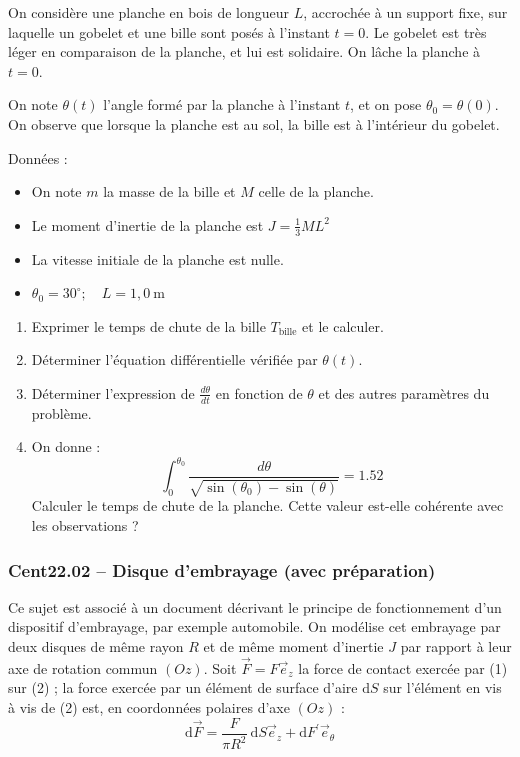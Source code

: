 On considère une planche en bois de longueur $L$, accrochée à un support fixe, sur laquelle un gobelet et une bille sont posés à l'instant $t = 0$. Le gobelet est très léger en comparaison de la planche, et lui est solidaire. On lâche la planche à $t = 0$.

\begin{center}
\end{center}
On note $\theta(t)$ l'angle formé par la planche à l'instant $t$, et on pose $\theta_0=\theta(0)$. On observe que lorsque la planche est au sol, la bille est à l'intérieur du gobelet.

Données :
\begin{itemize}
\item On note $m$ la masse de la bille et $M$ celle de la planche.
\item Le moment d'inertie de la planche est $J=\frac{1}{3} M L^2$
\item La vitesse initiale de la planche est nulle.
\item $\theta_0=30^{\circ} ; \quad L=1,0 \mathrm{~m}$
\end{itemize}

\begin{enumerate}
    \item Exprimer le temps de chute de la bille $T_{\text{bille}}$ et le calculer.
    \item Déterminer l'équation différentielle vérifiée par $\theta(t)$.
    \item Déterminer l'expression de $\frac{d\theta}{dt}$ en fonction de $\theta$ et des autres paramètres du problème.
    \item On donne :
    \[
    \int_0^{\theta_0} \frac{d\theta}{\sqrt{\sin(\theta_0) - \sin(\theta)}} = 1.52
    \]
    Calculer le temps de chute de la planche. Cette valeur est-elle cohérente avec les observations ?
\end{enumerate}

\newpage
\subsubsection*{Cent22.02 -- Disque d'embrayage (avec préparation)  \corrige}

Ce sujet est associé à un document décrivant le principe de fonctionnement d'un dispositif d'embrayage, par exemple automobile. On modélise cet embrayage par deux disques de même rayon $R$ et de même moment d'inertie $J$ par rapport à leur axe de rotation commun $(O z)$. Soit $\vec{F}=F \vec{e}_z$ la force de contact exercée par (1) sur (2) ; la force exercée par un élément de surface d'aire $\mathrm{d} S$ sur l'élément en vis à vis de (2) est, en coordonnées polaires d'axe $(O z)$ :
$$
\mathrm{d} \vec{F}=\frac{F}{\pi R^2} \mathrm{~d} S \vec{e}_z+\mathrm{d} F^{\prime} \vec{e}_\theta
$$
\begin{center}
\end{center}

